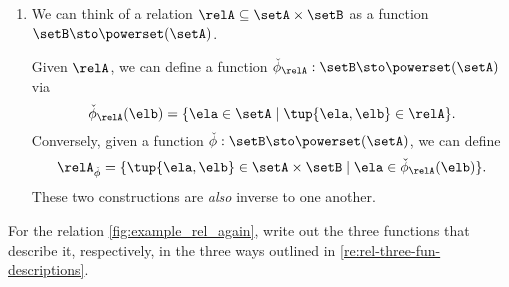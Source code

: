 \begin{remark}
\begin{enumerate}
        \item We can think of a relation $\relA \subseteq \setA \times \setB$ as a function $\setB  \sto \powerset (\setA)$.

        Given $\relA$, we can define a function $\check \phi_{\relA} : \setB \sto \powerset (\setA)$ via
        \begin{equation}
            \check \phi_{\relA} (\elb) = \{ \ela \in \setA \mid \tup{\ela, \elb} \in \relA \}.
        \end{equation}
        Conversely, given a function $\check \phi : \setB \sto \powerset (\setA)$, we can define
        \begin{equation}
            \relA_{\check \phi} = \{ \tup{\ela, \elb} \in \setA \times \setB \mid \ela \in \check \phi_{\relA}(\elb)   \}.
        \end{equation}
        These two constructions are \emph{also} inverse to one another.
    \end{enumerate}
\end{remark}

\begin{gradedexercise}
    \label{ex:Rel3Functions}
    For the relation \cref{fig:example_rel_again},
    write out the three functions that describe it, respectively, in the three ways outlined in \cref{re:rel-three-fun-descriptions}.
\end{gradedexercise}
\begin{marginfigure}
    \centering
    \caption{}
    \label{fig:example_rel_again}
\end{marginfigure}

